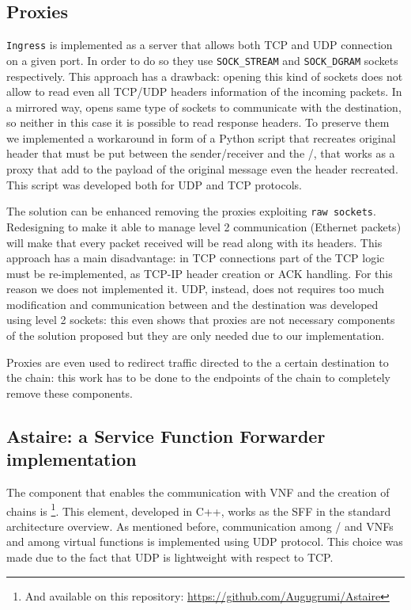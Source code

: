 \subsection{Proxies}
\texttt{Ingress} is implemented as a server that allows both TCP and UDP
connection on a given port. In order to do so they use \verb!SOCK_STREAM! and
\verb!SOCK_DGRAM! sockets respectively. This approach has a drawback: opening
this kind of sockets does not allow to read even all TCP/UDP headers information
of the
incoming packets. In a mirrored way, \egresses{} opens same type of sockets to
communicate with the destination, so neither in this case it is possible to read
response headers. To preserve them we implemented a workaround in form of a
Python script that recreates original header that must be put between the
sender/receiver and the \ingress{}/\egresses{}, that works as a proxy that add
to the payload of the original message even the header recreated. This script
was developed both for UDP and TCP protocols.

The solution can be enhanced removing the proxies exploiting
\texttt{raw sockets}. Redesigning \ironhide{} to make it able to manage level 2
communication (Ethernet packets) will make that every packet received will
be read along with its headers. This approach has a main disadvantage: in TCP
connections part of the TCP logic must be re-implemented, as TCP-IP header
creation or ACK handling. For this reason we does not implemented it. UDP,
instead, does not requires too much modification and communication between 
\egress{} and the destination was developed using level 2 sockets: this even
shows that proxies are not necessary components of the solution proposed but
they are only needed due to our implementation.

Proxies are even used to redirect traffic directed to the a certain destination
to the chain: this work has to be done to the endpoints of the chain to
completely remove these components.

\subsection{Astaire: a Service Function Forwarder implementation}
The component that enables the communication with VNF and the creation of chains
is \astaire{}\footnote{And available on this repository:
\url{https://github.com/Augugrumi/Astaire}}. This element, developed in C++,
works as the SFF in the standard architecture overview. As mentioned before,
communication among \ingresses{}/\egresses{} and VNFs and among virtual
functions is implemented using UDP protocol. This choice was made
due to the fact that UDP is lightweight with respect to TCP. 

